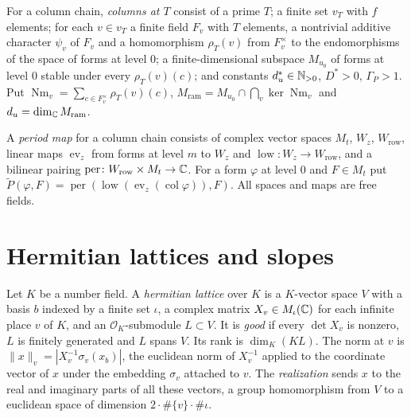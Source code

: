 \begin{definition}[columns at $T$]\label{geoa:columns-at-T}
For a column chain, \emph{columns at $T$} consist of a prime $T$; a finite set
$v_T$ with $f$ elements; for each $v\in v_T$ a finite field $F_v$ with $T$ elements, a
nontrivial additive character $\psi_v$ of $F_v$ and a homomorphism $\rho_T(v)$ from
$F_v^{\times}$ to the endomorphisms of the space of forms at level $0$; a
finite-dimensional subspace $M_{u_0}$ of forms at level $0$ stable under every
$\rho_T(v)(c)$; and constants $d^*_u\in\mathbb{N}_{>0}$, $D^*>0$, $\Gamma_P>1$. Put
$\operatorname{Nm}_v=\sum_{c\in F_v^{\times}}\rho_T(v)(c)$,
$M_{\mathrm{ram}}=M_{u_0}\cap\bigcap_v\ker\operatorname{Nm}_v$ and
$d_u=\dim_{\mathbb{C}} M_{\mathrm{ram}}$.
\end{definition}

\begin{definition}\label{geoa:period-map}
A \emph{period map} for a column chain consists of complex vector spaces $M_t$, $W_z$,
$W_{\mathrm{row}}$, linear maps $\operatorname{ev}_z$ from forms at level $m$ to $W_z$ and
$\operatorname{low}\colon W_z\to W_{\mathrm{row}}$, and a bilinear pairing
$\operatorname{per}\colon W_{\mathrm{row}}\times M_t\to\mathbb{C}$. For a form $\varphi$ at level
$0$ and $F\in M_t$ put
$\widetilde P(\varphi,F)=\operatorname{per}(\operatorname{low}(\operatorname{ev}_z(\operatorname{col}\varphi)),F)$.
All spaces and maps are free fields.
\end{definition}

\section{Hermitian lattices and slopes}

\begin{definition}\label{geoa:hlat}
Let $K$ be a number field. A \emph{hermitian lattice} over $K$ is a $K$-vector space $V$
with a basis $b$ indexed by a finite set $\iota$, a complex matrix $X_v\in M_{\iota}(\mathbb{C})$
for each infinite place $v$ of $K$, and an $\mathcal O_K$-submodule $L\subset V$. It is
\emph{good} if every $\det X_v$ is nonzero, $L$ is finitely generated and $L$ spans $V$.
Its rank is $\dim_K(K L)$. The norm at $v$ is
$\|x\|_v=|X_v^{-1}\sigma_v(x_b)|$, the euclidean norm of $X_v^{-1}$ applied to the
coordinate vector of $x$ under the embedding $\sigma_v$ attached to $v$. The
\emph{realization} sends $x$ to the real and imaginary parts of all these vectors, a
group homomorphism from $V$ to a euclidean space of dimension $2\cdot\#\{v\}\cdot\#\iota$.
\end{definition}

